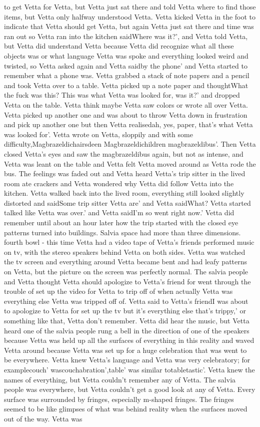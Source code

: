 \documentclass[12pt]{book}
\begin{document}
to get Vetta for Vetta, but Vetta just sat there and told Vetta where to find those items, but Vetta only halfway understood Vetta. Vetta kicked Vetta in the foot to indicate that Vetta should get Vetta, but again Vetta just sat there and time was ran out so Vetta ran into the kitchen saidWhere was it?', and Vetta told Vetta, but Vetta did understand Vetta because Vetta did recognize what all these objects was or what language Vetta was spoke and everything looked weird and twisted, so Vetta asked again and Vetta saidby the phone' and Vetta started to remember what a phone was. Vetta grabbed a stack of note papers and a pencil and took Vetta over to a table. Vetta picked up a note paper and thoughtWhat the fuck was this? This was what Vetta was looked for, was it?' and dropped Vetta on the table. Vetta think maybe Vetta saw colors or wrote all over Vetta. Vetta picked up another one and was about to throw Vetta down in frustration and pick up another one but then Vetta realisedah, yes, paper, that's what Vetta was looked for'. Vetta wrote on Vetta, sloppily and with some difficulty,Magbrazeldichairsdeen Magbrazeldichildren magbrazeldibus'. Then Vetta closed Vetta's eyes and saw the magbrazeldibus again, but not as intense, and Vetta was leant on the table and Vetta felt Vetta moved around as Vetta rode the bus. The feelings was faded out and Vetta heard Vetta's trip sitter in the lived room ate crackers and Vetta wondered why Vetta did follow Vetta into the kitchen. Vetta walked back into the lived room, everything still looked slightly distorted and saidSome trip sitter Vetta are' and Vetta saidWhat? Vetta started talked like Vetta was over.' and Vetta saidI'm so went right now.' Vetta did remember until about an hour later how the trip started with the closed eye patterns turned into buildings. Salvia space had more than three dimensions. fourth bowl - this time Vetta had a video tape of Vetta's friends performed music on tv, with the stereo speakers behind Vetta on both sides. Vetta was watched the tv screen and everything around Vetta became bent and had leafy patterns on Vetta, but the picture on the screen was perfectly normal. The salvia people and Vetta thought Vetta should apologize to Vetta's friend for went through the trouble of set up the video for Vetta to trip off of when actually Vetta was everything else Vetta was tripped off of. Vetta said to Vetta's friendI was about to apologize to Vetta for set up the tv but it's everything else that's trippy,' or something like that, Vetta don't remember. Vetta did hear the music, but Vetta heard one of the salvia people rung a bell in the direction of one of the speakers because Vetta was held up all the surfaces of everything in this reality and waved Vetta around because Vetta was set up for a huge celebration that was went to be everywhere. Vetta knew Vetta's language and Vetta was very celebratory; for examplecouch' wascouchabration',table' was similar totabletastic'. Vetta knew the names of everything, but Vetta couldn't remember any of Vetta. The salvia people was everywhere, but Vetta couldn't get a good look at any of Vetta. Every surface was surrounded by fringes, especially m-shaped fringes. The fringes seemed to be like glimpses of what was behind reality when the surfaces moved out of the way. Vetta was 
\end{document}
